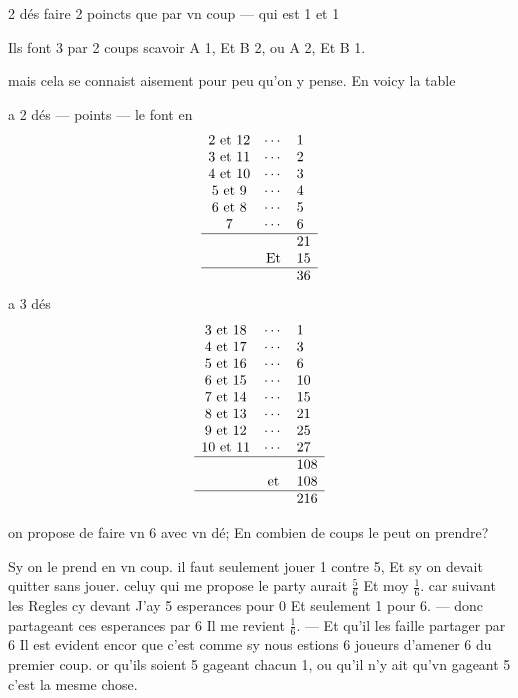 \documentclass[11pt,a4paper]{article}
\begin{document}
2 dés  faire 2 poincts que par vn coup — qui est 1 et 1

Ils font 3 par 2 coups scavoir A 1, Et B 2, ou A 2, Et B 1.

mais cela se connaist aisement pour peu qu'on y pense. En voicy la table

a 2 dés — points — le font en
\[
\begin{array}{ccl}
2 \text{ et } 12 & \cdots & 1 \\
3 \text{ et } 11 & \cdots & 2 \\
4 \text{ et } 10 & \cdots & 3 \\
5 \text{ et } 9 & \cdots & 4 \\
6 \text{ et } 8 & \cdots & 5 \\
7 & \cdots & 6 \\
\hline
 & & 21 \\
 & \text{Et} & 15 \\
\hline
 & & 36
\end{array}
\]
a 3 dés
\[
\begin{array}{ccl}
3 \text{ et } 18 & \cdots & 1 \\
4 \text{ et } 17 & \cdots & 3 \\
5 \text{ et } 16 & \cdots & 6 \\
6 \text{ et } 15 & \cdots & 10 \\
7 \text{ et } 14 & \cdots & 15 \\
8 \text{ et } 13 & \cdots & 21 \\
9 \text{ et } 12 & \cdots & 25 \\
10 \text{ et } 11 & \cdots & 27 \\
\hline
 & & 108 \\
 & \text{et} & 108 \\
\hline
 & & 216
\end{array}
\]

on propose de faire vn 6 avec vn dé; En combien de coups le peut on prendre?

Sy on le prend en vn coup. il faut seulement jouer 1 contre 5, Et sy on devait quitter sans jouer. celuy qui me propose le party aurait $\frac{5}{6}$ Et moy $\frac{1}{6}$. car suivant les Regles cy devant J'ay 5 esperances pour 0 Et seulement 1 pour 6. — donc partageant ces esperances par 6 Il me revient $\frac{1}{6}$. — Et qu'il les faille partager par 6 Il est evident encor que c'est comme sy nous estions 6 joueurs   d'amener 6 du premier coup. or qu'ils soient 5 gageant chacun 1, ou qu'il n'y ait qu'vn gageant 5 c'est la mesme chose.
\end{document}
